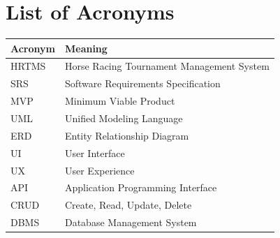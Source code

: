 \chapter*{List of Acronyms}

\begin{table}[h]
	\centering
	\begin{tabular}{|p{3cm}|p{10cm}|}
		\hline
		\textbf{Acronym} & \textbf{Meaning} \\
		\hline
		HRTMS & Horse Racing Tournament Management System \\
		\hline
		SRS & Software Requirements Specification \\
		\hline
		MVP & Minimum Viable Product \\
		\hline
		UML & Unified Modeling Language \\
		\hline
		ERD & Entity Relationship Diagram \\
		\hline
		UI & User Interface \\
		\hline
		UX & User Experience \\
		\hline
		API & Application Programming Interface \\
		\hline
		CRUD & Create, Read, Update, Delete \\
		\hline
		DBMS & Database Management System \\
		\hline
	\end{tabular}
\end{table}